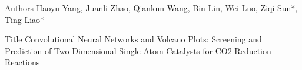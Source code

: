 Authors
Haoyu Yang, Juanli Zhao, Qiankun Wang, Bin Lin, Wei Luo, Ziqi Sun*, Ting Liao*

Title
Convolutional Neural Networks and Volcano Plots: Screening and Prediction of Two-Dimensional Single-Atom Catalysts for CO2 Reduction Reactions
